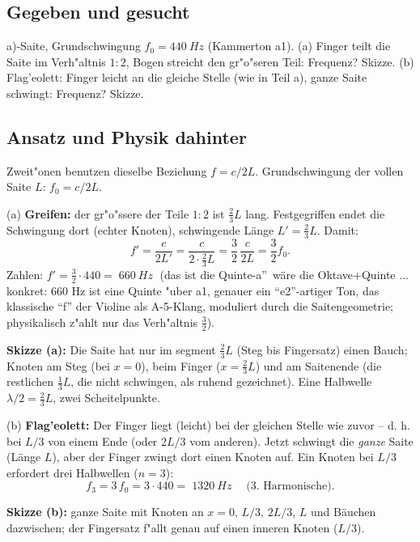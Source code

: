 
\subsection*{Gegeben und gesucht}
a)-Saite, Grundschwingung $f_0=\qty{440}{Hz}$ (Kammerton a1). (a) Finger
teilt die Saite im Verh"altnis $1:2$, Bogen streicht den gr"o"seren Teil:
Frequenz? Skizze. (b) Flag'eolett: Finger leicht an die gleiche Stelle
(wie in Teil a), ganze Saite schwingt: Frequenz? Skizze.

\subsection*{Ansatz und Physik dahinter}
Zweit"onen benutzen dieselbe Beziehung $f=c/2L$. Grundschwingung der vollen
Saite $L$: $f_0=c/2L$. 

(a) \textbf{Greifen:} der gr"o"ssere der Teile $1:2$ ist $\tfrac23 L$ lang.
Festgegriffen endet die Schwingung dort (echter Knoten), schwingende Länge
$L'=\tfrac23 L$. Damit:
\begin{equation}
  f'=\frac{c}{2L'}=\frac{c}{2\cdot\frac23L}=\frac32\,\frac{c}{2L}=\frac32 f_0.
\end{equation}
Zahlen: $f'=\tfrac32\cdot440=\boxed{\;\qty{660}{Hz}\;}$ (das ist die
Quinte-a''\ wäre die Oktave+Quinte ... konkret: $660$ Hz ist eine Quinte
"uber a1, genauer ein ``e2''-artiger Ton, das klassische ``f'' der Violine
als A-5-Klang, moduliert durch die Saitengeometrie; physikalisch z"ahlt nur
das Verh"altnis $\tfrac32$).

\textbf{Skizze (a):} Die Saite hat nur im segment $\tfrac23L$ (Steg bis
Fingersatz) einen Bauch; Knoten am Steg (bei $x=0$), beim Finger ($x=\tfrac23L$)
und am Saitenende (die restlichen $\tfrac13L$, die nicht schwingen, als ruhend
gezeichnet). Eine Halbwelle $\lambda/2=\tfrac23L$, zwei Scheitelpunkte.

(b) \textbf{Flag'eolett:} Der Finger liegt (leicht) bei der gleichen Stelle
wie zuvor -- d. h. bei $L/3$ von einem Ende (oder $2L/3$ vom anderen). Jetzt
schwingt die \emph{ganze} Saite (Länge $L$), aber der Finger zwingt dort einen
Knoten auf. Ein Knoten bei $L/3$ erfordert drei Halbwellen ($n=3$):
\begin{equation}
  f_3=3\,f_0=3\cdot440=\boxed{\;\qty{1320}{Hz}\;}
  \quad\text{(3. Harmonische)}.
\end{equation}

\textbf{Skizze (b):} ganze Saite mit Knoten an $x=0$, $L/3$, $2L/3$, $L$ und
Bäuchen dazwischen; der Fingersatz f"allt genau auf einen inneren Knoten
($L/3$).

